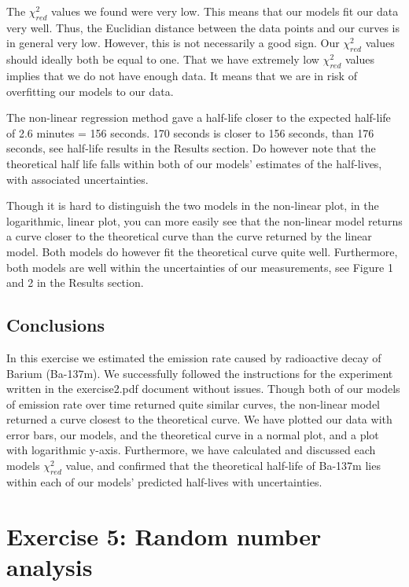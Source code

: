\documentclass[letterpaper,12pt]{article}
\begin{document}
The $\chi^2_{red}$ values we found were very low. This means that our models 
fit our data very well. Thus, the Euclidian distance between the data points and 
our curves is in general very low. However, this is not necessarily a good sign. 
Our $\chi^2_{red}$ values should ideally both be equal to one. 
That we have extremely low $\chi^2_{red}$ values implies that we do not 
have enough data. It means that we are in risk of overfitting our models to our data.

The non-linear regression method gave a half-life closer to the expected 
half-life of 2.6 minutes = 156 seconds. 170 seconds is closer to 156 seconds, 
than 176 seconds, see half-life results in the Results section. Do however note 
that the theoretical half life falls within both of our models’ estimates of 
the half-lives, with associated uncertainties.

Though it is hard to distinguish the two models in the non-linear plot, in the 
logarithmic, linear plot, you can more easily see that the non-linear model 
returns a curve closer to the theoretical curve than the curve returned by the 
linear model. Both models do however fit the theoretical curve quite well. 
Furthermore, both models are well within the uncertainties of our measurements, 
see Figure 1 and 2 in the Results section.

\subsection{Conclusions}

In this exercise we estimated the emission rate caused by radioactive 
decay of Barium (Ba-137m). We successfully followed the instructions for 
the experiment written in the exercise2.pdf document without issues. 
Though both of our models of emission rate over time returned quite similar 
curves, the non-linear model returned a curve closest to the theoretical curve. 
We have plotted our data with error bars, our models, and the theoretical 
curve in a normal plot, and a plot with logarithmic y-axis. Furthermore, 
we have calculated and discussed each models $\chi^2_{red}$ value, 
and confirmed that the theoretical half-life of Ba-137m lies within each of 
our models’ predicted half-lives with uncertainties. 

\pagebreak

\section{Exercise 5:  Random number analysis}
\end{document}
